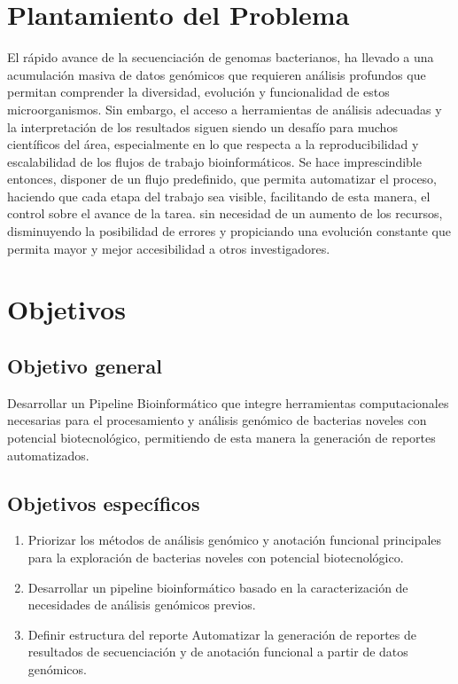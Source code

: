 \documentclass[12pt]{article}
\begin{document}
\newpage
\section{Plantamiento del Problema}
El rápido avance  de la secuenciación de genomas bacterianos, ha 
llevado a una acumulación masiva de datos genómicos que requieren 
análisis profundos que permitan comprender la diversidad, evolución 
y funcionalidad de estos microorganismos. Sin embargo, el acceso a 
herramientas de análisis adecuadas y la interpretación de los 
resultados siguen siendo un desafío para muchos científicos del 
área, especialmente en lo que respecta a la reproducibilidad y 
escalabilidad de los flujos de trabajo bioinformáticos. Se hace 
imprescindible entonces, disponer de un flujo predefinido, que 
permita automatizar el proceso, haciendo que cada etapa del trabajo 
sea visible, facilitando de esta manera, el control sobre el 
avance de la tarea. sin necesidad de un aumento de los recursos, 
disminuyendo la posibilidad de errores y  propiciando una evolución 
constante que permita mayor y mejor accesibilidad a otros 
investigadores.

\newpage
\section{Objetivos}
\subsection{Objetivo general}
Desarrollar un Pipeline Bioinformático que integre herramientas  computacionales 
necesarias para el procesamiento y  análisis genómico de bacterias noveles con potencial 
biotecnológico, permitiendo de esta manera la generación de reportes automatizados.
\subsection{Objetivos específicos}
\begin{enumerate}
    \item Priorizar los métodos de análisis genómico y anotación funcional 
        principales para la exploración de bacterias noveles con potencial biotecnológico.
    \item Desarrollar un pipeline bioinformático basado en la caracterización de 
        necesidades de análisis genómicos previos.
    \item Definir estructura del reporte Automatizar la generación de reportes de 
        resultados de secuenciación y de anotación funcional a partir de datos genómicos.
\end{enumerate}
\end{document}
